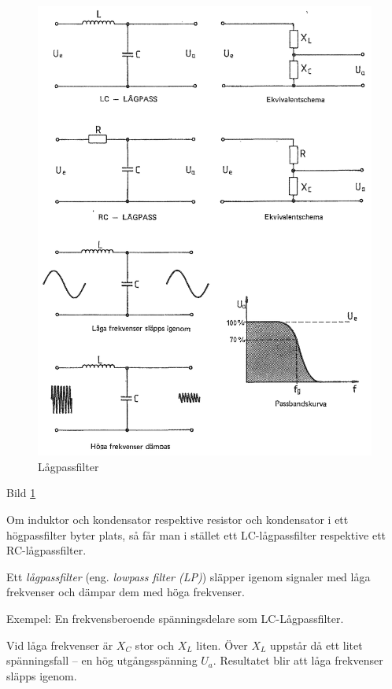 \begin{figure}
\includegraphics[width=\textwidth]{images/cropped_pdfs/bild_2_3-23.pdf}
\caption{Lågpassfilter}
\label{fig:BildII3-23}
\end{figure}

Bild \ref{fig:BildII3-23}

Om induktor och kondensator respektive resistor och kondensator i ett
högpassfilter byter plats, så får man i stället ett LC-lågpassfilter respektive
ett RC-lågpassfilter.

Ett \emph{lågpassfilter} (eng. \emph{lowpass filter (LP)}) släpper igenom
signaler med låga frekvenser och dämpar dem med höga frekvenser.

Exempel: En frekvensberoende spänningsdelare som LC-Lågpassfilter.

Vid låga frekvenser är \(X_C\) stor och \(X_L\) liten. Över \(X_L\) uppstår då
ett litet spänningsfall -- en hög utgångsspänning \(U_a\). Resultatet blir att
låga frekvenser släpps igenom.

